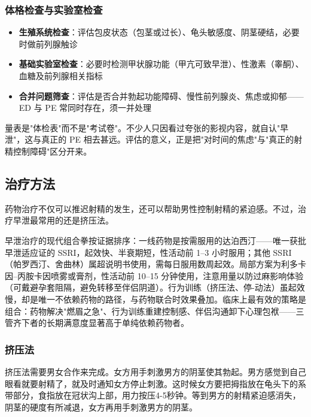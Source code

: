 \documentclass[12pt,a4paper,twoside]{ctexbook}
\begin{document}
\subsubsection{体格检查与实验室检查}

\begin{itemize}
	\item \textbf{生殖系统检查}：评估包皮状态（包茎或过长）、龟头敏感度、阴茎硬结，必要时做前列腺触诊
	\item \textbf{基础实验室检查}：必要时检测甲状腺功能（甲亢可致早泄）、性激素（睾酮）、血糖及前列腺相关指标
	\item \textbf{合并问题筛查}：评估是否合并勃起功能障碍、慢性前列腺炎、焦虑或抑郁——ED 与 PE 常同时存在，须一并处理
\end{itemize}

\begin{tcolorbox}[colback=pink!5!white,colframe=red!50!black,title=贴心小叮咛]
量表是"体检表"而不是"考试卷"。不少人只因看过夸张的影视内容，就自认"早泄"，这与真正的 PE 相去甚远。评估的意义，正是把"对时间的焦虑"与"真正的射精控制障碍"区分开来。
\end{tcolorbox}

\subsection{治疗方法}

药物治疗不仅可以推迟射精的发生，还可以帮助男性控制射精的紧迫感。不过，治疗早泄最常用的还是挤压法。


早泄治疗的现代组合拳按证据排序：一线药物是按需服用的达泊西汀——唯一获批早泄适应证的 SSRI，起效快、半衰期短，性活动前 1--3 小时服用；其他 SSRI（帕罗西汀、舍曲林）属超说明书使用，需每日服用数周起效。局部方案为利多卡因--丙胺卡因喷雾或膏剂，性活动前 10--15 分钟使用，注意用量以防过麻影响体验（可戴避孕套阻隔，避免转移至伴侣阴道）。行为训练（挤压法、停-动法）虽起效慢，却是唯一不依赖药物的路径，与药物联合时效果叠加。临床上最有效的策略是组合：药物解决"燃眉之急"、行为训练重建控制感、伴侣沟通卸下心理包袱——三管齐下者的长期满意度显著高于单纯依赖药物者。

\subsubsection{挤压法}

挤压法需要男女合作来完成。女方用手刺激男方的阴茎使其勃起。男方感觉到自己眼看就要射精了，就及时通知女方停止刺激。这时候女方要把拇指放在龟头下的系带部分，食指放在冠状沟上部，用力按压4-5秒钟。等到男方的射精紧迫感消失，阴茎的硬度有所减退，女方再用手刺激男方的阴茎。
\end{document}
